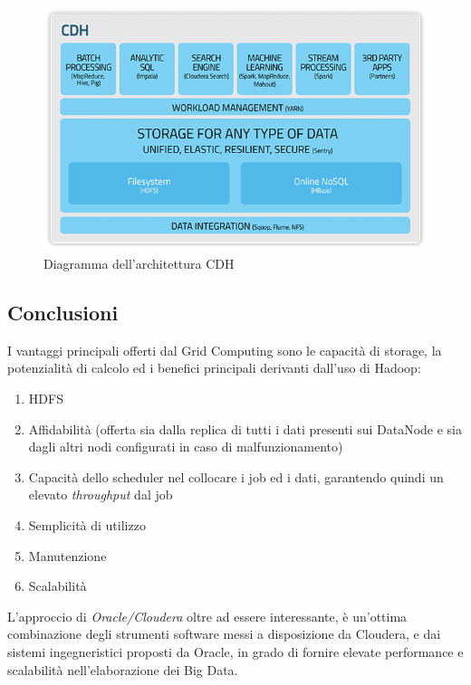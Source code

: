 \documentclass[11pt]{article}
\begin{document}
\begin{figure}[H]
	\centering
	\includegraphics[scale=0.65]{images/CDH_diagram.png}
	\caption{Diagramma dell'architettura CDH \cite{6511732}}
	\label{cdh}
\end{figure}

\subsection{Conclusioni}
I vantaggi principali offerti dal Grid Computing sono le capacità di storage, la potenzialità di calcolo ed i benefici principali derivanti dall'uso di Hadoop:
\begin{enumerate}
	\item HDFS
	\item Affidabilità (offerta sia dalla replica di tutti i dati presenti sui DataNode e sia dagli altri nodi configurati in caso di malfunzionamento)
	\item Capacità dello scheduler nel collocare i job ed i dati, garantendo quindi un elevato \emph{throughput} dal job
	\item Semplicità di utilizzo
	\item Manutenzione
	\item Scalabilità
\end{enumerate}

L'approccio di \emph{Oracle/Cloudera} oltre ad essere interessante, è un'ottima combinazione degli strumenti software messi a disposizione da Cloudera, e dai sistemi ingegneristici proposti da Oracle, in grado di fornire elevate performance e scalabilità nell'elaborazione dei Big Data.


\newpage
\end{document}
